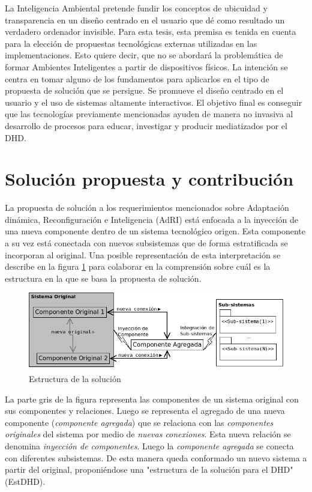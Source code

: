 {La Inteligencia Ambiental pretende fundir los conceptos de ubicuidad y
transparencia en un diseño centrado en el usuario que dé como resultado un
verdadero ordenador invisible. Para esta tesis, esta premisa es tenida en
cuenta para la elección de propuestas tecnológicas externas utilizadas en las
implementaciones. Esto quiere decir, que no se abordará la problemática de
formar Ambientes Inteligentes a partir de dispositivos físicos. La intención se centra en tomar alguno de los fundamentos para aplicarlos en el tipo de
propuesta de solución que se persigue. Se promueve el diseño centrado en el usuario y el uso de sistemas altamente interactivos. El objetivo
final es conseguir que las tecnologías previamente mencionadas ayuden de manera
no invasiva al desarrollo de procesos para educar, investigar y producir mediatizados por el DHD.

\section{Solución propuesta y contribución} \label{solución}

La propuesta de solución a los requerimientos mencionados sobre
Adaptación dinámica, Reconfiguración e Inteligencia (AdRI) está enfocada a la
inyección de una nueva componente dentro de un sistema tecnológico origen. Esta
componente a su vez está conectada con nuevos subsistemas que de forma
estratificada se incorporan al original. Una posible representación de esta
interpretación se describe en la figura \ref{fig:solucion} para colaborar en la comprensión sobre cuál es la estructura en la que se basa la propuesta de
solución.


\begin{figure}[h]
\begin{center}
 \includegraphics[width=4 in,totalheight=3 in] {Ch0/solucion}
\caption{Estructura de la solución} \label{fig:solucion}
\end{center}
\end{figure}

La parte gris de la figura representa las componentes de un sistema original
con sus componentes y relaciones. Luego se representa el agregado de una nueva
componente (\textit{componente agregada}) que se relaciona con las
\textit{componentes originales} del sistema por medio de \textit{nuevas
conexiones}. Esta nueva relación se denomina \textit{inyección de componentes}.
Luego la \textit{componente agregada} se conecta con diferentes subsistemas. De
esta manera queda conformado un nuevo sistema a partir del
original, proponiéndose una "estructura de la solución para
el DHD" (EstDHD).

}
